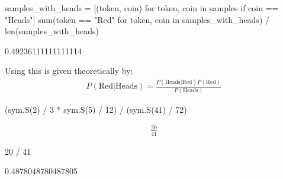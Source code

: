\begin{pyin}
samples_with_heads = [(token, coin) for token, coin in samples if coin == "Heads"]
sum(token == "Red" for token, coin in samples_with_heads) / len(samples_with_heads)
\end{pyin}





\begin{raw}
0.49236111111111114
\end{raw}






Using  this is given theoretically by:
\begin{equation*}
\begin{split}
    P(\text{Red}|\text{Heads}) = \frac{P(\text{Heads} | \text{Red})P(\text{Red})}{P(\text{Heads})}
\end{split}
\end{equation*}



\begin{pyin}
(sym.S(2) / 3 * sym.S(5) / 12) / (sym.S(41) / 72)
\end{pyin}




\begin{equation*}
\begin{split}\displaystyle \frac{20}{41}\end{split}
\end{equation*}







\begin{pyin}
20 / 41
\end{pyin}





\begin{raw}
0.4878048780487805
\end{raw}







